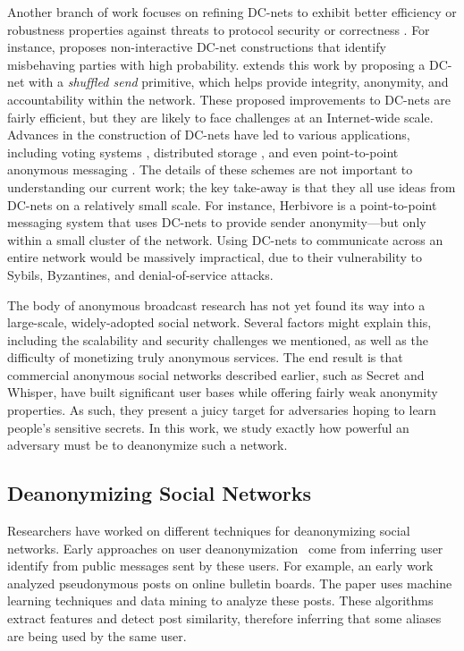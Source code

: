 \documentclass[10pt, twocolumn]{article}
\begin{document}
Another branch of work focuses on refining DC-nets to exhibit better efficiency or robustness properties against threats to protocol security or correctness \cite{waidner1989dining,golle2004dining,corrigan2010dissent}.
For instance, \cite{golle2004dining} proposes non-interactive DC-net constructions that identify misbehaving parties with high probability.
\cite{corrigan2010dissent} extends this work by proposing a DC-net with a \emph{shuffled send} primitive, which helps provide integrity, anonymity, and accountability within the network.
These proposed improvements to DC-nets are fairly efficient, but they are likely to face challenges at an Internet-wide scale.
Advances in the construction of DC-nets have led to various applications, including voting systems \cite{fujioka1993practical,van2010anonymous}, distributed storage \cite{freeHavenProject}, and even point-to-point anonymous messaging \cite{goel2003herbivore}.
The details of these schemes are not important to understanding our current work; the key take-away is that they all use ideas from DC-nets on a relatively small scale.
For instance, Herbivore \cite{goel2003herbivore} is a point-to-point messaging system that uses DC-nets to provide sender anonymity---but only within a small cluster of the network.
Using DC-nets to communicate across an entire network would be massively impractical, due to their vulnerability to Sybils, Byzantines, and denial-of-service attacks.

The body of anonymous broadcast research has not yet found its way into a large-scale, widely-adopted social network. 
Several factors might explain this, including the scalability and security challenges we mentioned, as well as the difficulty of monetizing truly anonymous services.
The end result is that commercial anonymous social networks described earlier, such as Secret and Whisper, have built significant user bases while offering fairly weak anonymity properties.
As such, they present a juicy target for adversaries hoping to learn people's sensitive secrets.
In this work, we study exactly how powerful an adversary must be to deanonymize such a network.

\subsection{Deanonymizing Social Networks}

Researchers have worked on different techniques for deanonymizing social networks. Early approaches on user deanonymization~\cite{novak2004anti,narayanan2006break} come from inferring user identify from public messages sent by these users. For example, an early work~\cite{novak2004anti} analyzed pseudonymous posts on online bulletin boards. The paper uses machine learning techniques and data mining to analyze these posts. These algorithms extract features and detect post similarity, therefore inferring that some aliases are being used by the same user. 
\end{document}
